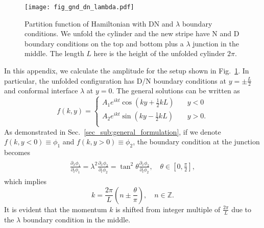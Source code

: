 
\begin{figure}[h]
\centering
\texttt{[image: fig\_gnd\_dn\_lambda.pdf]}
\caption{Partition function of Hamiltonian with DN and $\lambda$ boundary conditions. We unfold the cylinder and the new stripe have N and D boundary conditions on the top and bottom plus a $\lambda$ junction in the middle. The length $L$ here is the height of the unfolded cylinder $2\pi$. }
\label{fig:Fig_gnd_dn_lambda}
\end{figure}

In this appendix, we calculate the amplitude for the setup shown in Fig.~\ref{fig:Fig_gnd_dn_lambda}. In particular, the unfolded configuration has D/N boundary conditions at $y = \pm \frac{L}{2}$ and conformal interface $\lambda$ at $y = 0$. The general solutions can be written as
\begin{equation}
\label{eq:normalized_f}
f(k, y) = 
\left\lbrace
\begin{aligned}
  A_1 e^{i kt} \cos\left(ky +\frac{1}{2}kL \right) &  \quad y < 0  \\
  A_2 e^{ikt}  \sin\left(ky - \frac{1}{2}kL \right) & \quad y > 0 .  \\
\end{aligned} \right. 
\end{equation}
As demonstrated in Sec.~\ref{sec_sub:general_formulation}, if we denote $f(k,y<0)\equiv\phi_1$ and $f(k,y>0)\equiv\phi_2$, the boundary condition at the junction becomes
\begin{eqnarray}\begin{aligned}
\frac{\partial_x \phi_1}{ \partial_t \phi_1} = \lambda^2 \frac{\partial_x \phi_2}{ \partial_t \phi_2} = \tan^2 \theta\frac{\partial_x \phi_2}{ \partial_t \phi_2}, \quad \theta \in \left[0,\frac{\pi}{2} \right]  ,
\end{aligned}\end{eqnarray}
which implies
\begin{equation}
\label{eq:momentum_gnd_dn_lambda}
k = \frac{2\pi}{L}\left( n \pm \frac{\theta}{\pi} \right),  \quad n\in\mathbb{Z}.
\end{equation}
It is evident that the momentum $k$ is shifted from integer multiple of $\frac{2\pi}{L}$ due to the $\lambda$ boundary condition in the middle. 

